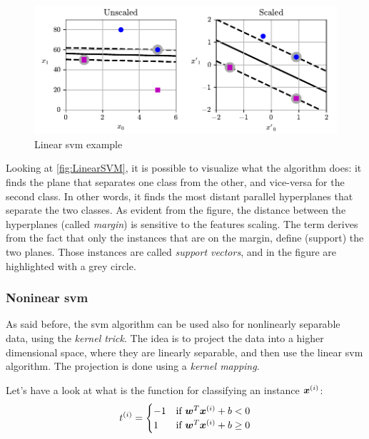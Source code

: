 \begin{figure}
    \centering
    \includegraphics[width=\textwidth]{images/MachineLearning/LinearSVM.pdf}
    \caption{Linear \gls{svm} example }
    \label{fig:LinearSVM}
\end{figure}

Looking at \autoref{fig:LinearSVM}, it is possible to visualize what the algorithm does: it finds the plane that separates one class from the other, and vice-versa for the second class. In other words, it finds the most distant parallel hyperplanes that separate the two classes. As evident from the figure, the distance between the hyperplanes (called \emph{margin}) is sensitive to the features scaling. The term  derives from the fact that only the instances that are on the margin, define (support) the two planes. Those instances are called \emph{support vectors}, and in the figure are highlighted with a grey circle.

\subsubsection{Noninear \gls{svm}}
\label{subsubsec:NoninearSVM}
As said before, the \gls{svm} algorithm can be used also for nonlinearly separable data, using the \emph{kernel trick}. The idea is to project the data into a higher dimensional space, where they are linearly separable, and then use the linear \gls{svm} algorithm. The projection is done using a \emph{kernel mapping}. 

Let's have a look at what is the function for classifying an instance $\bm{x}^{(i)}$:
\begin{equation}
    t^{(i)} = \begin{cases}
        -1 & \text{if } \bm{w}^T\bm{x}^{(i)} + b < 0 \\
        1 & \text{if } \bm{w}^T\bm{x}^{(i)} + b \geq 0 
    \end{cases}
\end{equation}


